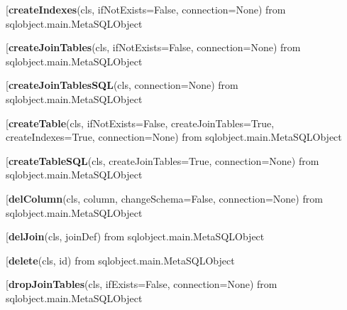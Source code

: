 \begin{description}\item[{\bf createIndexes}(cls, ifNotExists=False, connection=None) from sqlobject.main.MetaSQLObject\end{description}

\begin{description}\item[{\bf createJoinTables}(cls, ifNotExists=False, connection=None) from sqlobject.main.MetaSQLObject\end{description}

\begin{description}\item[{\bf createJoinTablesSQL}(cls, connection=None) from sqlobject.main.MetaSQLObject\end{description}

\begin{description}\item[{\bf createTable}(cls, ifNotExists=False, createJoinTables=True, createIndexes=True, connection=None) from sqlobject.main.MetaSQLObject\end{description}

\begin{description}\item[{\bf createTableSQL}(cls, createJoinTables=True, connection=None) from sqlobject.main.MetaSQLObject\end{description}

\begin{description}\item[{\bf delColumn}(cls, column, changeSchema=False, connection=None) from sqlobject.main.MetaSQLObject\end{description}

\begin{description}\item[{\bf delJoin}(cls, joinDef) from sqlobject.main.MetaSQLObject\end{description}

\begin{description}\item[{\bf delete}(cls, id) from sqlobject.main.MetaSQLObject\end{description}

\begin{description}\item[{\bf dropJoinTables}(cls, ifExists=False, connection=None) from sqlobject.main.MetaSQLObject\end{description}


